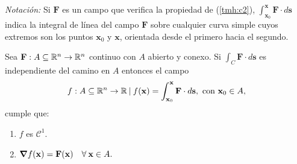 \textit{Notación:} Si  $\mathbf{F}$ es un campo que verifica la propiedad de (\ref{tmh:c2}),   $\int_{\mathbf{x}_0}^{\mathbf{x}}\mathbf{F}\cdot d\mathbf{s}$ indica la integral de l\'inea del campo $\mathbf{F}$  sobre cualquier curva simple cuyos extremos son los puntos $\mathbf{x}_0$  y $\mathbf{x}$,  orientada desde el primero hacia el segundo.





\begin{theorem}\label{tmh:t2}
   Sea  $\mathbf{F}:A\subseteq\mathbb{R}^n \to \mathbb{R}^n$ continuo con  $A$ abierto y conexo. Si  $\int_C \mathbf{F}\cdot d\mathbf{s}$ es independiente del camino en $A$  entonces el campo
    $$f:A\subseteq\mathbb{R}^n\to\mathbb{R}\: | \:f(\mathbf{x})=\int_{\mathbf{x}_0}^{\mathbf{x}}\mathbf{F}\cdot d\mathbf{s},  \mbox{ con }  \mathbf{x}_0\in A, $$
    cumple que: 
    \begin{enumerate}
        \item $f$ es $\mathcal{C}^1$.
        \item $\grad f(\mathbf{x})=\mathbf{F}(\mathbf{x})\quad\forall\:\mathbf{x}\in A.$
    \end{enumerate}
\end{theorem}
